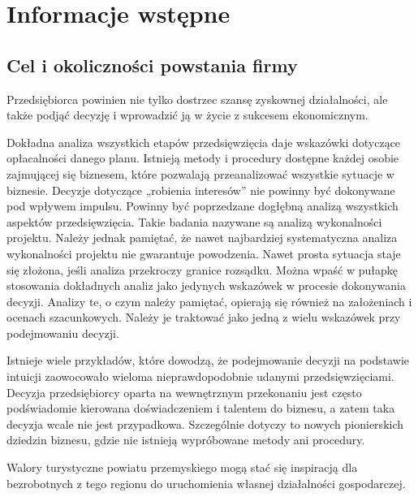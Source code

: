 \documentclass{sprawozdanie-agh}
\begin{document}
   


	\stronatytulowa{}

	\section{Informacje wstępne}

		\subsection{Cel i okoliczności powstania firmy}

		Przedsiębiorca powinien nie tylko dostrzec szansę zyskownej działalności, ale także podjąć decyzję i wprowadzić ją w życie z sukcesem ekonomicznym.
		
		Dokładna analiza wszystkich etapów przedsięwzięcia daje wskazówki dotyczące opłacalności danego planu. Istnieją metody i procedury dostępne każdej osobie zajmującej się biznesem, które pozwalają przeanalizować wszystkie sytuacje w biznesie. Decyzje dotyczące „robienia interesów” nie powinny być dokonywane pod wpływem impulsu. Powinny być poprzedzane dogłębną analizą wszystkich aspektów przedsięwzięcia. Takie badania nazywane są analizą wykonalności projektu. Należy jednak pamiętać, że nawet najbardziej systematyczna analiza wykonalności projektu nie gwarantuje powodzenia. Nawet prosta sytuacja staje się złożona, jeśli analiza przekroczy granice rozsądku. Można wpaść w pułapkę stosowania dokładnych analiz jako jedynych wskazówek w procesie dokonywania decyzji. Analizy te, o czym należy pamiętać, opierają się również na założeniach i ocenach szacunkowych. Należy je traktować jako jedną z wielu wskazówek przy podejmowaniu decyzji.
		
		Istnieje wiele przykładów, które dowodzą, że podejmowanie decyzji na podstawie intuicji zaowocowało wieloma nieprawdopodobnie udanymi przedsięwzięciami. Decyzja przedsiębiorcy oparta na wewnętrznym przekonaniu jest często podświadomie kierowana doświadczeniem i talentem do biznesu, a zatem taka decyzja wcale nie jest przypadkowa. Szczególnie dotyczy to nowych pionierskich dziedzin biznesu, gdzie nie istnieją wypróbowane metody ani procedury.
		
		Walory turystyczne powiatu przemyskiego mogą stać się inspiracją dla bezrobotnych z tego regionu do uruchomienia własnej działalności gospodarczej.
		
\end{document}
